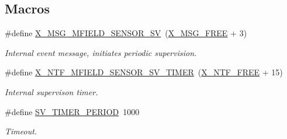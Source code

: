 \subsection*{Macros}
\begin{DoxyCompactItemize}
\item 
\#define \hyperlink{a00025_a510020575747f82c587c5485b8619f78}{X\+\_\+\+M\+S\+G\+\_\+\+M\+F\+I\+E\+L\+D\+\_\+\+S\+E\+N\+S\+O\+R\+\_\+\+S\+V}~(\hyperlink{a00036_a082eb6e82ded25b00f04da4f611c961e}{X\+\_\+\+M\+S\+G\+\_\+\+F\+R\+E\+E} + 3)
\begin{DoxyCompactList}\small\item\em Internal event message, initiates periodic supervision. \end{DoxyCompactList}\item 
\#define \hyperlink{a00025_ad9eede821e7c65d58f1806af4bd6bf29}{X\+\_\+\+N\+T\+F\+\_\+\+M\+F\+I\+E\+L\+D\+\_\+\+S\+E\+N\+S\+O\+R\+\_\+\+S\+V\+\_\+\+T\+I\+M\+E\+R}~(\hyperlink{a00036_ab2eeea4643823a0c7c7731ddb83e3edc}{X\+\_\+\+N\+T\+F\+\_\+\+F\+R\+E\+E} + 15)
\begin{DoxyCompactList}\small\item\em Internal supervison timer. \end{DoxyCompactList}\item 
\#define \hyperlink{a00025_a8a535456285f4602701c814d7b69cc68}{S\+V\+\_\+\+T\+I\+M\+E\+R\+\_\+\+P\+E\+R\+I\+O\+D}~1000
\begin{DoxyCompactList}\small\item\em Timeout. \end{DoxyCompactList}\end{DoxyCompactItemize}
